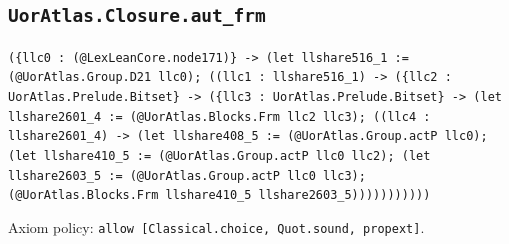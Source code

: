 \documentclass[11pt]{article}
\begin{document}
\subsection*{\texttt{UorAtlas.Closure.aut\_frm}}
\noindent\texttt{(\{llc0 : (@LexLeanCore.node171)\} -> (let llshare516\_1 := (@UorAtlas.Group.D21 llc0); ((llc1 : llshare516\_1) -> (\{llc2 : UorAtlas.Prelude.Bitset\} -> (\{llc3 : UorAtlas.Prelude.Bitset\} -> (let llshare2601\_4 := (@UorAtlas.Blocks.Frm llc2 llc3); ((llc4 : llshare2601\_4) -> (let llshare408\_5 := (@UorAtlas.Group.actP llc0); (let llshare410\_5 := (@UorAtlas.Group.actP llc0 llc2); (let llshare2603\_5 := (@UorAtlas.Group.actP llc0 llc3); (@UorAtlas.Blocks.Frm llshare410\_5 llshare2603\_5)))))))))))}\par
\noindent Axiom policy: \texttt{allow [Classical.choice, Quot.sound, propext]}.\par
\end{document}
